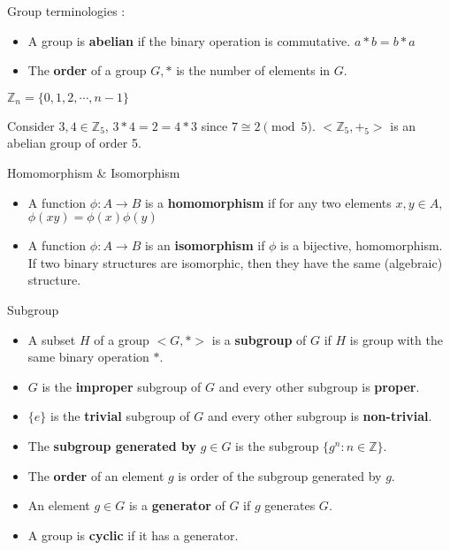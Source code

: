 \begin{definition}Group terminologies :
	\begin{itemize}
		\item A group is \textbf{abelian} if the binary operation is commutative. $a \ast b = b \ast a$ %
		\item The \textbf{order} of a group $G,\ast$ is the number of elements in $G$.%
	\end{itemize}
\end{definition}

\begin{definition}
	$\mathbb{Z}_n = \{ 0, 1, 2, \cdots, n-1 \}$
\end{definition}

\begin{remark}
	Consider $3,4 \in \mathbb{Z}_5$,
	$3 \ast 4 = 2 = 4 \ast 3$ since $7 \cong 2 \pmod 5$.
	$<\!\mathbb{Z}_5,+_5\!>$ is an abelian group of order 5.
\end{remark}

\begin{definition} Homomorphism \& Isomorphism
	\begin{itemize}
		\item A function $\phi : A \to B$ is a \textbf{homomorphism} if for any two elements $x,y \in A$, $\phi (xy) = \phi(x)\phi(y)$%
		\item A function $\phi : A \to B$ is an \textbf{isomorphism} if $\phi$ is a bijective, homomorphism.
			If two binary structures  are isomorphic, then they have the same (algebraic) structure.%
	\end{itemize}
\end{definition}

\begin{definition} Subgroup
	\begin{itemize}
		\item A subset $H$ of a group $<\! G,\ast\! >$ is a \textbf{subgroup} of $G$ if $H$ is group with the same binary operation $\ast$. %
		\item $G$ is the \textbf{improper} subgroup of $G$ and every other subgroup is \textbf{proper}.%
		\item $\{e\}$ is the \textbf{trivial} subgroup of $G$ and every other subgroup is \textbf{non-trivial}.%
		\item The \textbf{subgroup generated by} $g \in G$ is the subgroup $\{ g^n : n \in \mathbb{Z} \}$.%
		\item The \textbf{order} of an element $g$ is order of the subgroup generated by $g$.%
		\item An element $g \in G$ is a \textbf{generator} of $G$ if $g$ generates $G$.%
		\item A group is \textbf{cyclic} if it has a generator.%
	\end{itemize}
\end{definition}

